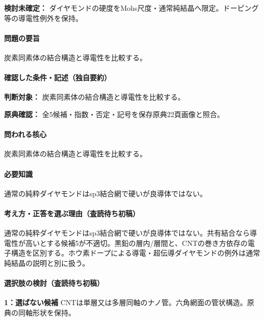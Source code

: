 \par\textbf{検討未確定：} ダイヤモンドの硬度をMohs尺度・通常純結晶へ限定。ドーピング等の導電性例外を保持。

\paragraph{問題の要旨} 炭素同素体の結合構造と導電性を比較する。

\paragraph{確認した条件・記述（独自要約）}\mbox{}\par

\noindent\textbf{判断対象：} 炭素同素体の結合構造と導電性を比較する。\par

\noindent\textbf{原典確認：} 全5候補・指数・否定・記号を保存原典22頁画像と照合。\par

\paragraph{問われる核心} 炭素同素体の結合構造と導電性を比較する。

\paragraph{必要知識} 通常の純粋ダイヤモンドはsp3結合網で硬いが良導体ではない。

\paragraph{考え方・正答を選ぶ理由（査読待ち初稿）} 通常の純粋ダイヤモンドはsp3結合網で硬いが良導体ではない。共有結合なら導電性が高いとする候補5が不適切。黒鉛の層内/層間と、CNTの巻き方依存の電子構造を区別する。ホウ素ドープによる導電・超伝導ダイヤモンドの例外は通常純結晶の説明と別に扱う。

\paragraph{選択肢の検討（査読待ち初稿）}\mbox{}\par

\noindent\textbf{1：選ばない候補} CNTは単層又は多層同軸のナノ管。六角網面の管状構造。原典の同軸形状を保持。\par

